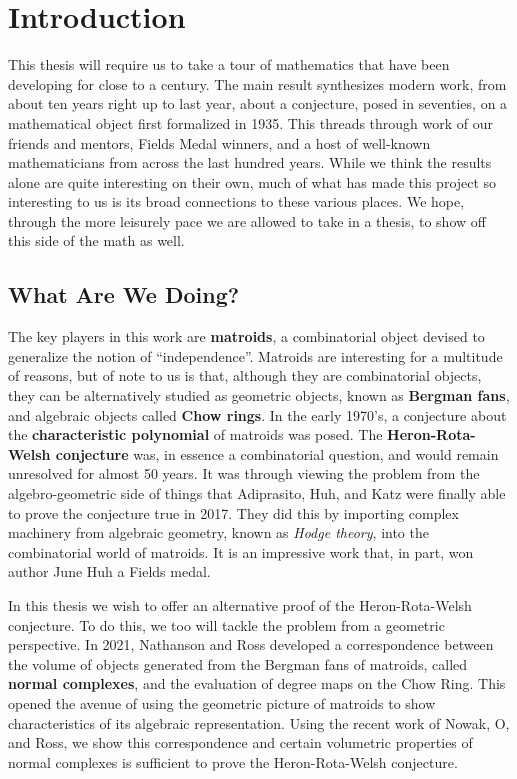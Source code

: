 \documentclass[12pt,oneside]{../../sfsuthesis}
\begin{document}
\chapter{Introduction}


This thesis will require us to take a tour of mathematics that have been developing for close to a century.
The main result synthesizes modern work, from about ten years right up to last year, about a conjecture, posed in seventies, on a mathematical object first formalized in 1935.
This threads through work of our friends and mentors, Fields Medal winners, and a host of well-known mathematicians from across the last hundred years.
While we think the results alone are quite interesting on their own, much of what has made this project so interesting to us is its broad connections to these various places.
We hope, through the more leisurely pace we are allowed to take in a thesis, to show off this side of the math as well.

\section{What Are We Doing?}

The key players in this work are \textbf{matroids}, a combinatorial object devised to generalize the notion of ``independence''.
Matroids are interesting for a multitude of reasons, but of note to us is that, although they are combinatorial objects, they can be alternatively studied as geometric objects, known as \textbf{Bergman fans}, and algebraic objects called \textbf{Chow rings}.
In the early 1970's, a conjecture about the \textbf{characteristic polynomial} of matroids was posed.
The \textbf{Heron-Rota-Welsh conjecture} was, in essence a combinatorial question, and would remain unresolved for almost 50 years.
It was through viewing the problem from the algebro-geometric side of things that Adiprasito, Huh, and Katz were finally able to prove the conjecture true in 2017.
They did this by importing complex machinery from algebraic geometry, known as \emph{Hodge theory}, into the combinatorial world of matroids.
It is an impressive work that, in part, won author June Huh a Fields medal.

In this thesis we wish to offer an alternative proof of the Heron-Rota-Welsh conjecture.
To do this, we too will tackle the problem from a geometric perspective.
In 2021, Nathanson and Ross developed a correspondence between the volume of objects generated from the Bergman fans of matroids, called \textbf{normal complexes}, and the evaluation of degree maps on the Chow Ring.
This opened the avenue of using the geometric picture of matroids to show characteristics of its algebraic representation.
Using the recent work of Nowak, O, and Ross, we show this correspondence and certain volumetric properties of normal complexes is sufficient to prove the Heron-Rota-Welsh conjecture.
\end{document}
